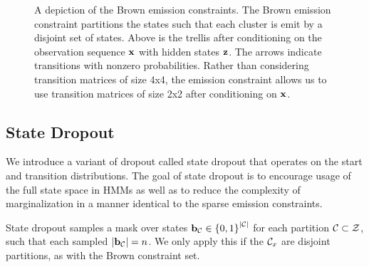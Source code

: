 \documentclass[11pt,a4paper]{article}
\begin{document}
\begin{figure}[t]
\begin{center}
\end{center}
\caption{A depiction of the Brown emission constraints.
The Brown emission constraint partitions the states such that
each cluster is emit by a disjoint set of states.
Above is the trellis after conditioning on the observation sequence $\mathbf{x}$
with hidden states $\mathbf{z}$.
The arrows indicate transitions with nonzero probabilities.
Rather than considering transition matrices of size 4x4,
the emission constraint allows us to use transition matrices of size 2x2
after conditioning on $\mathbf{x}$.
}
\end{figure}


\subsection{State Dropout}
We introduce a variant of dropout called state dropout that operates on the
start and transition distributions.
The goal of state dropout is to encourage usage of the full state space in HMMs
as well as to reduce the complexity of marginalization in a manner
identical to the sparse emission constraints.

State dropout samples a mask over states
$\mathbf{b}_{\mathcal{C}} \in \left\{0,1\right\}^{|\mathcal{C}|}$ for each partition $\mathcal{C} \subset \mathcal{Z}$,
such that each sampled $|\mathbf{b}_{\mathcal{C}}| = n$.
We only apply this if the $\mathcal{C}_x$ are disjoint partitions,
as with the Brown constraint set.
\end{document}
